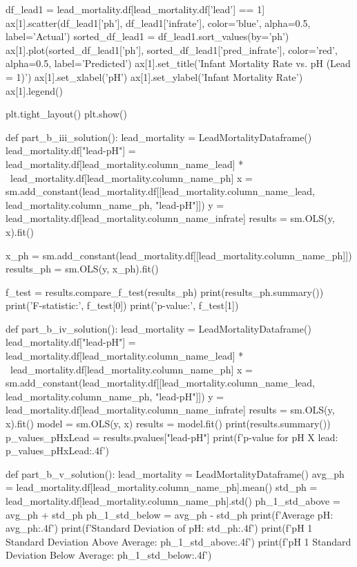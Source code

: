 \documentclass{uofa-eng-assignment}
\begin{document}
\begin{python}
    df_lead1 = lead_mortality.df[lead_mortality.df['lead'] == 1]
    ax[1].scatter(df_lead1['ph'], df_lead1['infrate'],
                  color='blue', alpha=0.5, label='Actual')
    sorted_df_lead1 = df_lead1.sort_values(by='ph')
    ax[1].plot(sorted_df_lead1['ph'], sorted_df_lead1['pred_infrate'],
               color='red', alpha=0.5, label='Predicted')
    ax[1].set_title('Infant Mortality Rate vs. pH (Lead = 1)')
    ax[1].set_xlabel('pH')
    ax[1].set_ylabel('Infant Mortality Rate')
    ax[1].legend()

    plt.tight_layout()
    plt.show()


def part_b_iii_solution():
    lead_mortality = LeadMortalityDataframe()
    lead_mortality.df["lead-pH"] = lead_mortality.df[lead_mortality.column_name_lead] * \
        lead_mortality.df[lead_mortality.column_name_ph]
    x = sm.add_constant(lead_mortality.df[[lead_mortality.column_name_lead,
                                           lead_mortality.column_name_ph, "lead-pH"]])
    y = lead_mortality.df[lead_mortality.column_name_infrate]
    results = sm.OLS(y, x).fit()

    x_ph = sm.add_constant(lead_mortality.df[[lead_mortality.column_name_ph]])
    results_ph = sm.OLS(y, x_ph).fit()

    f_test = results.compare_f_test(results_ph)
    print(results_ph.summary())
    print('F-statistic:', f_test[0])
    print('p-value:', f_test[1])


def part_b_iv_solution():
    lead_mortality = LeadMortalityDataframe()
    lead_mortality.df["lead-pH"] = lead_mortality.df[lead_mortality.column_name_lead] * \
        lead_mortality.df[lead_mortality.column_name_ph]
    x = sm.add_constant(lead_mortality.df[[lead_mortality.column_name_lead,
                                           lead_mortality.column_name_ph, "lead-pH"]])
    y = lead_mortality.df[lead_mortality.column_name_infrate]
    results = sm.OLS(y, x).fit()
    model = sm.OLS(y, x)
    results = model.fit()
    print(results.summary())
    p_values_pHxLead = results.pvalues["lead-pH"]
    print(f'p-value for pH X lead: {p_values_pHxLead:.4f}')


def part_b_v_solution():
    lead_mortality = LeadMortalityDataframe()
    avg_ph = lead_mortality.df[lead_mortality.column_name_ph].mean()
    std_ph = lead_mortality.df[lead_mortality.column_name_ph].std()
    ph_1_std_above = avg_ph + std_ph
    ph_1_std_below = avg_ph - std_ph
    print(f'Average pH: {avg_ph:.4f}')
    print(f'Standard Deviation of pH: {std_ph:.4f}')
    print(f'pH 1 Standard Deviation Above Average: {ph_1_std_above:.4f}')
    print(f'pH 1 Standard Deviation Below Average: {ph_1_std_below:.4f}')



\end{python}
\end{document}
